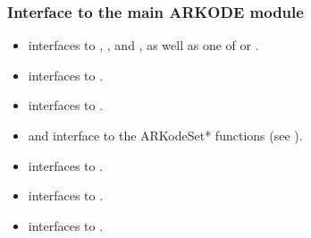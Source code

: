 \documentclass[letterpaper,10pt,english]{sphinxmanual}
\begin{document}
\subsubsection{Interface to the main ARKODE module}
\label{f_interface/Routines:interface-to-the-main-arkode-module}\begin{itemize}
\item {} 
{\hyperref[f_interface/Usage:f/_/FARKMALLOC]{\emph{}}} interfaces to {\hyperref[c_interface/User_callable:c.ARKodeCreate]{\emph{}}},
{\hyperref[c_interface/User_callable:c.ARKodeSetUserData]{\emph{}}}, and {\hyperref[c_interface/User_callable:c.ARKodeInit]{\emph{}}}, as well
as one of {\hyperref[c_interface/User_callable:c.ARKodeSStolerances]{\emph{}}} or {\hyperref[c_interface/User_callable:c.ARKodeSVtolerances]{\emph{}}}.

\item {} 
{\hyperref[f_interface/Usage:f/_/FARKREINIT]{\emph{}}} interfaces to {\hyperref[c_interface/User_callable:c.ARKodeReInit]{\emph{}}}.

\item {} 
{\hyperref[f_interface/Usage:f/_/FARKRESIZE]{\emph{}}} interfaces to {\hyperref[c_interface/User_callable:c.ARKodeResize]{\emph{}}}.

\item {} 
{\hyperref[f_interface/Usage:f/_/FARKSETIIN]{\emph{}}} and {\hyperref[f_interface/Usage:f/_/FARKSETRIN]{\emph{}}} interface to the
ARKodeSet* functions (see {\hyperref[c_interface/User_callable:cinterface-optionalinputs]{\emph{}}}).

\item {} 
{\hyperref[f_interface/Usage:f/_/FARKEWTSET]{\emph{}}} interfaces to {\hyperref[c_interface/User_callable:c.ARKodeWFtolerances]{\emph{}}}.

\item {} 
{\hyperref[f_interface/Usage:f/_/FARKADAPTSET]{\emph{}}} interfaces to {\hyperref[c_interface/User_callable:c.ARKodeSetAdaptivityFn]{\emph{}}}.

\item {} 
{\hyperref[f_interface/Usage:f/_/FARKEXPSTABSET]{\emph{}}} interfaces to {\hyperref[c_interface/User_callable:c.ARKodeSetStabilityFn]{\emph{}}}.

\end{itemize}
\end{document}

